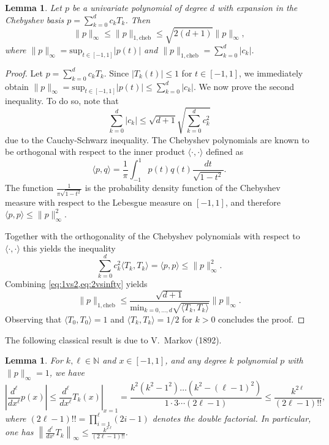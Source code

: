 \documentclass[11pt]{article}
\newcommand{\N}{\mathbb{N}}
\renewcommand{\sup}{\mathrm{sup}}
\renewcommand{\min}{\mathrm{min}}
\newtheorem{lemma}[defin]{Lemma}
\theoremstyle{definition}
\newcommand{\cheb}{{1,\mathrm{cheb}}}
\newcommand{\SG}[1]{\textcolor{orange}{[SG: #1]}}
\begin{document}
\begin{lemma}
\label{lem:normconversion}
    Let $p$ be a univariate polynomial of degree $d$ with expansion in the Chebyshev basis $p = \sum_{k=0}^d c_k T_k$. Then
    \[
    \|p\|_\infty \leq \|p\|_\cheb \leq \sqrt{2(d+1)} \|p\|_\infty,
    \]
    where
    $\|p\|_\infty = \sup_{t\in [-1,1]} |p(t)|$ and $\|p\|_\cheb = \sum_{k=0}^d |c_k|$.
\end{lemma}
\begin{proof}
Let $p = \sum_{k=0}^d c_k T_k$. Since $|T_k(t)| \leq 1$ for $t \in [-1,1]$, we immediately obtain
$\|p\|_\infty = \sup_{t \in [-1,1]} |p(t)| \leq \sum_{k=0}^d |c_k|$.
We now prove the second inequality. To do so, note that
\begin{equation} \label{eq:1vs2}
\sum_{k=0}^d |c_k| \leq \sqrt{d+1} \sqrt{\sum_{k=0}^d c_k^2}
\end{equation}
due to the Cauchy-Schwarz inequality. The Chebyshev polynomials are known to be orthogonal with respect to the inner product $\langle \cdot, \cdot \rangle$ defined as
\[
\langle p, q\rangle = \frac{1}{\pi} \int_{-1}^1 p(t)q(t) \frac{dt}{\sqrt{1-t^2}}.
\]
The function $\frac{1}{\pi\sqrt{1-t^2}}$ is the probability density function of the Chebyshev measure with respect to the Lebesgue measure on $[-1,1]$, and therefore $\langle p,p \rangle \leq \|p\|_\infty^2$.

Together with the orthogonality of the Chebyshev polynomials with respect to $\langle \cdot, \cdot \rangle$ this yields the inequality
\begin{equation} \label{eq:2vsinfty}
 \sum_{k=0}^d c_k^2 \langle T_k, T_k \rangle = \langle p,p\rangle \leq \|p\|_\infty^2 .
\end{equation}
Combining \cref{eq:1vs2,eq:2vsinfty} yields
\[
\|p\|_\cheb \leq \frac{\sqrt{d+1}}{\min_{k=0,...,d} \sqrt{\langle T_k,T_k \rangle}} \|p\|_\infty.
\]
Observing that $\langle T_0, T_0 \rangle = 1$ and $\langle T_k, T_k\rangle = 1/2$ for $k>0$ concludes the proof.
\end{proof}

The following classical result is due to V.\ Markov (1892).
\begin{lemma} \label{eq:Cheb_der}
    For $k,\ell \in \N$ and $x \in [-1,1]$, and any degree $k$ polynomial $p$ with $\|p\|_\infty = 1$, we have
{
\[
    \left|\frac{d^\ell}{dx^\ell} p(x)\right| \le \left.\frac{d^\ell}{dx^\ell} T_k(x)\right|_{x=1}
    = \frac{k^2(k^2-1^2)\ldots (k^2-(\ell-1)^2)}{1\cdot 3 \cdots (2\ell -1)} \le \frac{k^{2\ell}}{(2\ell -1)!!},
\]
where $(2\ell -1)!! = \prod_{i=1}^\ell (2i-1)$ denotes the double factorial.
In particular, one has $\left\|\frac{d^\ell}{dx^\ell} T_k\right\|_\infty \le \frac{k^{2\ell}}{(2\ell -1)!!}$.}
\end{lemma}
\end{document}
